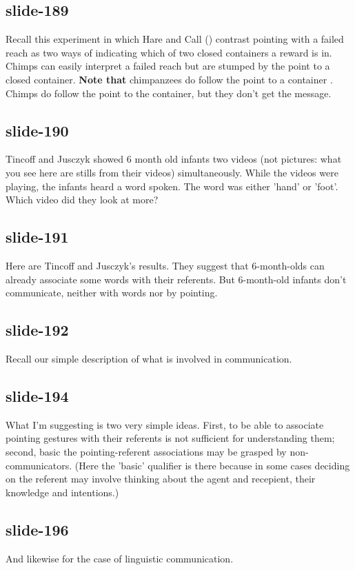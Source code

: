 \documentclass[12pt,\papersize]{extarticle}
\begin{document}
 
\subsection{slide-189}
Recall this experiment in which Hare and Call (\citeyear{hare_chimpanzees_2004}) contrast pointing with a failed reach as two ways of indicating which of two closed containers a reward is in. Chimps can easily interpret a failed reach but are stumped by the point to a closed container.
\textbf{Note that} chimpanzees do follow the point to a container \citep[see][p.\ 6]{Moll:2007gu}.
Chimps do follow the point to the container, but they don't get the message.
 
 
\subsection{slide-190}
Tincoff and Jusczyk showed 6 month old infants two videos (not pictures: what you see here are stills from their videos) simultaneously.
While the videos were playing, the infants heard a word spoken. The word was either 'hand' or 'foot'.
Which video did they look at more?
 
 
\subsection{slide-191}
Here are Tincoff and Jusczyk's results.
They suggest that 6-month-olds can already associate some words with their referents.
But 6-month-old infants don't communicate, neither with words nor by pointing.
 
 
\subsection{slide-192}
Recall our simple description of what is involved in communication.
 
 
\subsection{slide-194}
What I'm suggesting is two very simple ideas. First, to be able to associate pointing gestures with their referents is not sufficient for understanding them; second, basic the pointing-referent associations may be grasped by non-communicators.
(Here the 'basic' qualifier is there because in some cases deciding on the referent may involve thinking about the agent and recepient, their knowledge and intentions.)
 
 
\subsection{slide-196}
And likewise for the case of linguistic communication.

 






\end{document}
